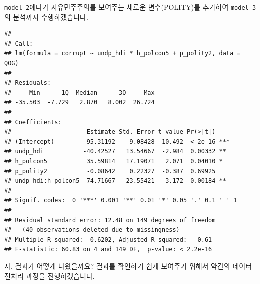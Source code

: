 \documentclass[]{book}
\newenvironment{Shaded}{\begin{snugshade}}{\end{snugshade}}
\newcommand{\DataTypeTok}[1]{\textcolor[rgb]{0.13,0.29,0.53}{#1}}
\newcommand{\KeywordTok}[1]{\textcolor[rgb]{0.13,0.29,0.53}{\textbf{#1}}}
\newcommand{\NormalTok}[1]{#1}
\newcommand{\OperatorTok}[1]{\textcolor[rgb]{0.81,0.36,0.00}{\textbf{#1}}}
\newcommand{\StringTok}[1]{\textcolor[rgb]{0.31,0.60,0.02}{#1}}
\begin{document}
\texttt{model\ 2}에다가 자유민주주의를 보여주는 새로운 변수(POLITY)를 추가하여 \texttt{model\ 3}의 분석까지 수행하겠습니다.

\begin{Shaded}
\end{Shaded}

\begin{verbatim}
## 
## Call:
## lm(formula = corrupt ~ undp_hdi * h_polcon5 + p_polity2, data = QOG)
## 
## Residuals:
##     Min      1Q  Median      3Q     Max 
## -35.503  -7.729   2.870   8.002  26.724 
## 
## Coefficients:
##                     Estimate Std. Error t value Pr(>|t|)    
## (Intercept)         95.31192    9.08428  10.492  < 2e-16 ***
## undp_hdi           -40.42527   13.54667  -2.984  0.00332 ** 
## h_polcon5           35.59814   17.19071   2.071  0.04010 *  
## p_polity2           -0.08642    0.22327  -0.387  0.69925    
## undp_hdi:h_polcon5 -74.71667   23.55421  -3.172  0.00184 ** 
## ---
## Signif. codes:  0 '***' 0.001 '**' 0.01 '*' 0.05 '.' 0.1 ' ' 1
## 
## Residual standard error: 12.48 on 149 degrees of freedom
##   (40 observations deleted due to missingness)
## Multiple R-squared:  0.6202, Adjusted R-squared:   0.61 
## F-statistic: 60.83 on 4 and 149 DF,  p-value: < 2.2e-16
\end{verbatim}

자, 결과가 어떻게 나왔을까요? 결과를 확인하기 쉽게 보여주기 위해서 약간의 데이터 전처리 과정을 진행하겠습니다.
\end{document}
